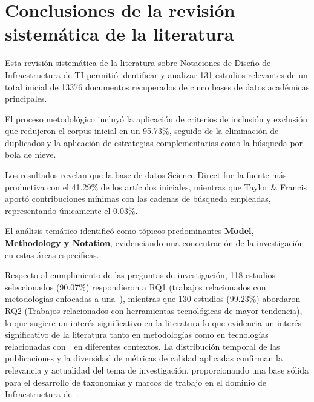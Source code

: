 \section{Conclusiones de la revisión sistemática de la literatura}
\noindent
Esta revisión sistemática de la literatura sobre Notaciones de Diseño de Infraestructura de TI permitió identificar y analizar 131 estudios relevantes de un total inicial de 13376 documentos recuperados de cinco bases de datos académicas principales. 

El proceso metodológico incluyó la aplicación de criterios de inclusión y exclusión que redujeron el corpus inicial en un 95.73\%, seguido de la eliminación de duplicados y la aplicación de estrategias complementarias como la búsqueda por bola de nieve. 

Los resultados revelan que la base de datos Science Direct fue la fuente más productiva con el 41.29\% de los artículos iniciales, mientras que Taylor \& Francis aportó contribuciones mínimas con las cadenas de búsqueda empleadas, representando únicamente el 0.03\%. 

El análisis temático identificó como tópicos predominantes \textbf{Model, Methodology y Notation}, evidenciando una concentración de la investigación en estas áreas específicas. 

Respecto al cumplimiento de las preguntas de investigación, 118 estudios seleccionados (90.07\%) respondieron a RQ1 (trabajos relacionados con metodologías enfocadas a una~\NDITI), mientras que 130 estudios (99.23\%) abordaron RQ2 (Trabajos relacionados con herramientas tecnológicas de mayor tendencia), lo que sugiere un interés significativo en la literatura lo que evidencia un interés significativo de la literatura tanto en metodologías como en tecnologías relacionadas con~\NDITI~en diferentes contextos. La distribución temporal de las publicaciones y la diversidad de métricas de calidad aplicadas confirman la relevancia y actualidad del tema de investigación, proporcionando una base sólida para el desarrollo de taxonomías y marcos de trabajo en el dominio de Infraestructura de~\TI.